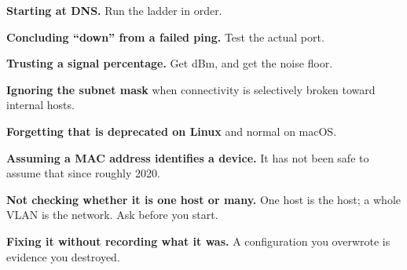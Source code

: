 \begin{pitfall}
\begin{tight}
  \item \textbf{Starting at DNS.} Run the ladder in order.
  \item \textbf{Concluding ``down'' from a failed ping.} Test the actual port.
  \item \textbf{Trusting a signal percentage.} Get dBm, and get the noise floor.
  \item \textbf{Ignoring the subnet mask} when connectivity is selectively broken
        toward internal hosts.
  \item \textbf{Forgetting that  is deprecated on Linux} and normal
        on macOS.
  \item \textbf{Assuming a MAC address identifies a device.} It has not been safe
        to assume that since roughly 2020.
  \item \textbf{Not checking whether it is one host or many.} One host is the
        host; a whole VLAN is the network. Ask before you start.
  \item \textbf{Fixing it without recording what it was.} A configuration you
        overwrote is evidence you destroyed.
\end{tight}
\end{pitfall}

